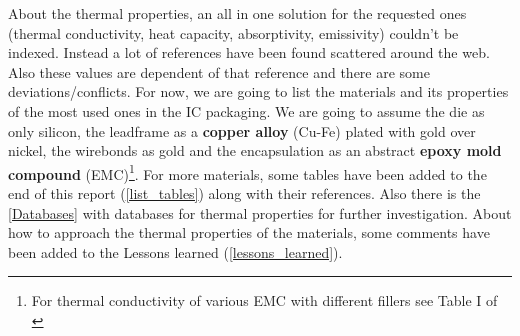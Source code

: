 \documentclass[final]{cubedoc}
\begin{document}
	
	About the thermal properties, an all in one solution for the requested ones (thermal conductivity, heat capacity, absorptivity, emissivity) couldn't be indexed. Instead a lot of references have been found scattered around the web. Also these values are dependent of that reference and there are some deviations/conflicts. For now, we are going to list the materials and its properties of the most used ones in the IC packaging. We are going to assume the die as only silicon, the leadframe as a \textbf{copper alloy} (Cu-Fe) plated with gold over nickel, the wirebonds as gold and the encapsulation as an abstract \textbf{epoxy mold compound} (EMC)\footnote{For thermal conductivity of various EMC with different fillers see Table I of \cite{Cheng2018StudyOT}}. For more materials, some tables have been added to the end of this report (\cref{list_tables}) along with their references. Also there is the \cref{Databases} with databases for thermal properties for further investigation. About how to approach the thermal properties of the materials, some comments have been added to the Lessons learned (\cref{lessons_learned}).
	
	\begin{table}[h!]
		\centering
		\caption{Material Bulk properties of QFP}
		\label{tab:my_label}
	\end{table}
	
\end{document}

